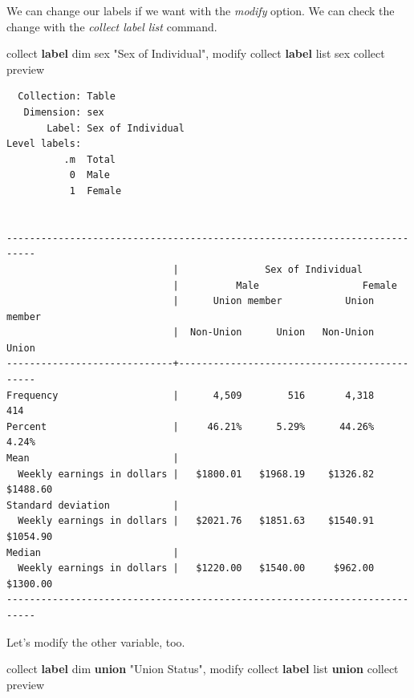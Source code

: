 \documentclass[
]{book}
\newenvironment{Shaded}{\begin{snugshade}}{\end{snugshade}}
\newcommand{\KeywordTok}[1]{\textcolor[rgb]{0.13,0.29,0.53}{\textbf{#1}}}
\newcommand{\NormalTok}[1]{#1}
\newcommand{\OtherTok}[1]{\textcolor[rgb]{0.56,0.35,0.01}{#1}}
\newcommand{\StringTok}[1]{\textcolor[rgb]{0.31,0.60,0.02}{#1}}
\begin{document}
We can change our labels if we want with the \emph{modify} option. We can check the change with the \emph{collect label list } command.

\begin{Shaded}
\begin{Highlighting}[]
\NormalTok{collect }\KeywordTok{label}\NormalTok{ dim sex }\StringTok{"Sex of Individual"}\NormalTok{, modify}
\NormalTok{collect }\KeywordTok{label} \OtherTok{list}\NormalTok{ sex}
\NormalTok{collect preview}
\end{Highlighting}
\end{Shaded}

\begin{verbatim}
  Collection: Table
   Dimension: sex
       Label: Sex of Individual
Level labels:
          .m  Total
           0  Male
           1  Female


---------------------------------------------------------------------------
                             |               Sex of Individual             
                             |          Male                  Female       
                             |      Union member           Union member    
                             |  Non-Union      Union   Non-Union      Union
-----------------------------+---------------------------------------------
Frequency                    |      4,509        516       4,318        414
Percent                      |     46.21%      5.29%      44.26%      4.24%
Mean                         |                                             
  Weekly earnings in dollars |   $1800.01   $1968.19    $1326.82   $1488.60
Standard deviation           |                                             
  Weekly earnings in dollars |   $2021.76   $1851.63    $1540.91   $1054.90
Median                       |                                             
  Weekly earnings in dollars |   $1220.00   $1540.00     $962.00   $1300.00
---------------------------------------------------------------------------
\end{verbatim}

Let's modify the other variable, too.

\begin{Shaded}
\begin{Highlighting}[]
\NormalTok{collect }\KeywordTok{label}\NormalTok{ dim }\KeywordTok{union} \StringTok{"Union Status"}\NormalTok{, modify}
\NormalTok{collect }\KeywordTok{label} \OtherTok{list} \KeywordTok{union}
\NormalTok{collect preview}
\end{Highlighting}
\end{Shaded}
\end{document}
